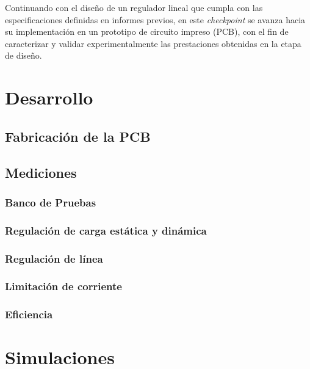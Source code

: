 \documentclass[]{article}
\begin{document}
	Continuando con el diseño de un regulador lineal que cumpla con las especificaciones definidas en informes previos, en este \textit{checkpoint} se avanza hacia su implementación en un prototipo de circuito impreso (PCB), con el fin de caracterizar y validar experimentalmente las prestaciones obtenidas en la etapa de diseño.
	
	\section{Desarrollo}
	
	\subsection{Fabricación de la PCB}
	
	
	\subsection{Mediciones} 
	\subsubsection{Banco de Pruebas}
	
	\subsubsection{Regulación de carga estática y dinámica}
	
	\subsubsection{Regulación de línea}
	
	\subsubsection{Limitación de corriente}
	
	\subsubsection{Eficiencia}

	\section{Simulaciones}
	\label{sec:simulaciones}
	
	

	{\footnotesize
		\printbibliography
	}
	
\end{document}
